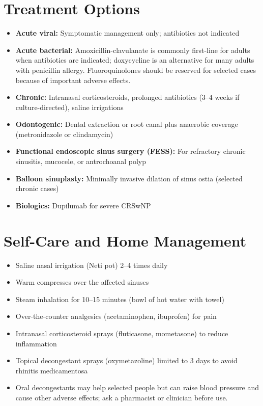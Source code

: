 \section*{Treatment Options}
\begin{itemize}
  \item \textbf{Acute viral:} Symptomatic management only; antibiotics not indicated
  \item \textbf{Acute bacterial:} Amoxicillin-clavulanate is commonly first-line for adults when antibiotics are indicated; doxycycline is an alternative for many adults with penicillin allergy. Fluoroquinolones should be reserved for selected cases because of important adverse effects.
  \item \textbf{Chronic:} Intranasal corticosteroids, prolonged antibiotics (3--4 weeks if culture-directed), saline irrigations
  \item \textbf{Odontogenic:} Dental extraction or root canal plus anaerobic coverage (metronidazole or clindamycin)
  \item \textbf{Functional endoscopic sinus surgery (FESS):} For refractory chronic sinusitis, mucocele, or antrochoanal polyp
  \item \textbf{Balloon sinuplasty:} Minimally invasive dilation of sinus ostia (selected chronic cases)
  \item \textbf{Biologics:} Dupilumab for severe CRSwNP
\end{itemize}

\section*{Self-Care and Home Management}
\begin{itemize}
  \item Saline nasal irrigation (Neti pot) 2--4 times daily
  \item Warm compresses over the affected sinuses
  \item Steam inhalation for 10--15 minutes (bowl of hot water with towel)
  \item Over-the-counter analgesics (acetaminophen, ibuprofen) for pain
  \item Intranasal corticosteroid sprays (fluticasone, mometasone) to reduce inflammation
  \item Topical decongestant sprays (oxymetazoline) limited to 3 days to avoid rhinitis medicamentosa
  \item Oral decongestants may help selected people but can raise blood pressure and cause other adverse effects; ask a pharmacist or clinician before use.
\end{itemize}

